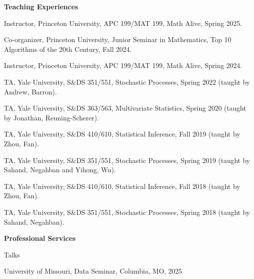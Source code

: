 \documentclass{article}
\begin{document}
\vspace{5mm}
\begin{large}
\noindent \textbf{Teaching Experiences}
\end{large}
\vspace{5mm}

Instructor, Princeton University, APC 199/MAT 199, Math Alive, Spring 2025.

\vspace{2mm}

Co-organizer, Princeton University, Junior Seminar in Mathematics, Top 10 Algorithms of the 20th Century, Fall 2024.

\vspace{2mm}

Instructor, Princeton University, APC 199/MAT 199, Math Alive, Spring 2024.

\vspace{2mm}
TA, Yale University, S\&{DS} 351/551, Stochastic Processes, Spring 2022 (taught by Andrew, Barron). 

\vspace{2mm}
TA, Yale University, S\&{DS} 363/563, Multivariate Statistics, Spring 2020 (taught by Jonathan, Reuning-Scherer). 

\vspace{2mm}
TA, Yale University, S\&{DS} 410/610, Statistical Inference, Fall 2019 (taught by Zhou, Fan). 

\vspace{2mm}
TA, Yale University, S\&{DS} 351/551, Stochastic Processes, Spring 2019 (taught by Sahand, Negahban and Yihong, Wu). 

\vspace{2mm}
TA, Yale University, S\&{DS} 410/610, Statistical Inference, Fall 2018 (taught by Zhou, Fan). 

\vspace{2mm}
TA, Yale University, S\&{DS} 351/551, Stochastic Processes, Spring 2018 (taught by Sahand, Negahban). 



\vspace{5mm}
\begin{large}
\noindent \textbf{Professional Services}
\end{large}
\vspace{5mm}

\begin{large}
\noindent Talks
\end{large}


\vspace{2mm}
University of Missouri, Data Seminar, Columbia, MO, 2025
\end{document}
